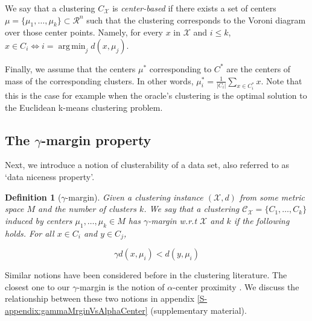 \documentclass{article}
\newcommand{\mc}{\mathcal}
\DeclareMathOperator*{\argmin}{arg\,min}
\newtheorem{definition}[theorem]{Definition}
\begin{document}
We say that a clustering $C_{\mc X}$ is \emph{center-based} if there exists a set of centers $\mc \mu = \{\mu_1, \ldots, \mu_k\} \subset \mc R^n$ such that the clustering corresponds to the Voroni diagram over those center points. Namely, for every $x$ in $\mc X$ and $i \leq k$,  $x\in C_i \Leftrightarrow i=\argmin_j d(x,\mu_j)$. 







Finally, we assume that the centers $\mu^*$ corresponding to $C^*$ are the centers of mass of the corresponding clusters. In other words, $\mu^*_i=\frac{1}{|C_i|}\sum_{x\in C^*_i} x$. Note that this is the case for example when the oracle's clustering is the optimal solution to the Euclidean k-means clustering problem.

\subsection{The $\gamma$-margin property}
Next, we introduce a notion of clusterability of a data set, also referred to as `data niceness property'.

\begin{definition}[$\gamma$-margin]
\label{defn:alphacp}
Given a clustering instance $(\mc X, d)$ from some metric space $M$ and the number of clusters $k$. We say that a clustering $\mc C_{\mc X} = \{C_1, \ldots, C_k\}$ induced by centers $\mu_1, \ldots, \mu_k \in M$ has $\gamma$-margin w.r.t $\mc X$ and $k$ if the following holds. For all $x \in C_i$ and $y \in C_j$,

$$\gamma d(x, \mu_i) < d(y, \mu_i)$$
\end{definition}

Similar notions have been considered before in the clustering literature. The closest one to our $\gamma$-margin is the notion of $\alpha$-center proximity \cite{balcan2012clustering,awasthi2012center}. We discuss the relationship between these two notions in appendix \ref{S-appendix:gammaMrginVsAlphaCenter} (supplementary material). 
\end{document}
